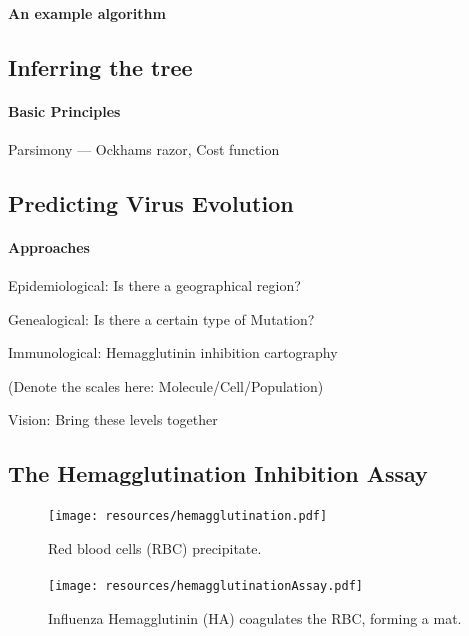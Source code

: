 \documentclass{beamer}
\begin{document}
\begin{darkframes}
    \begin{frame}{\subsecname}
      \framesubtitle{An example algorithm}

    \end{frame}

    \subsection{Inferring the tree}

    \begin{frame}{\subsecname}
      \framesubtitle{Basic Principles}

      Parsimony --- Ockhams razor, Cost function

    \end{frame}

    \subsection{Predicting Virus Evolution}

    \begin{frame}
      \framesubtitle{Approaches}

      Epidemiological: Is there a geographical region?

      Genealogical: Is there a certain type of Mutation?

      Immunological: Hemagglutinin inhibition cartography

      (Denote the scales here: Molecule/Cell/Population)

      Vision: Bring these levels together
    \end{frame}

    \subsection{The Hemagglutination Inhibition Assay}

    \begin{frame}{\subsecname}
      \framesubtitle{}
      \begin{figure}
        \texttt{[image: resources/hemagglutination.pdf]}
        \caption{Red blood cells (RBC) precipitate.}
        \label{1}
      \end{figure}
    \end{frame}

    \begin{frame}{\subsecname}
      \framesubtitle{}
      \begin{figure}
        \texttt{[image: resources/hemagglutinationAssay.pdf]}
        \caption{Influenza Hemagglutinin (HA) coagulates the RBC, forming a mat.}
      \end{figure}
    \end{frame}


\end{darkframes}
\end{document}
